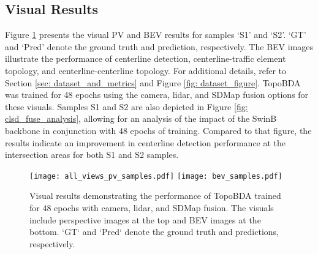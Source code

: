\subsection{Visual Results}
\label{sup_sec: visual_results}

Figure \ref{sup_fig: pv_and_bev_samples} presents the visual PV and BEV results for samples `S1' and `S2'. `GT' and `Pred' denote the ground truth and prediction, respectively. The BEV images illustrate the performance of centerline detection, centerline-traffic element topology, and centerline-centerline topology. For additional details, refer to Section \ref{sec: dataset_and_metrics} and Figure \ref{fig: dataset_figure}. TopoBDA was trained for 48 epochs using the camera, lidar, and SDMap fusion options for these visuals. Samples S1 and S2 are also depicted in Figure \ref{fig: clsd_fuse_analysis}, allowing for an analysis of the impact of the SwinB backbone in conjunction with 48 epochs of training. Compared to that figure, the results indicate an improvement in centerline detection performance at the intersection areas for both S1 and S2 samples.

\begin{figure}[tb]
  \centering
  \texttt{[image: all\_views\_pv\_samples.pdf]}
  \texttt{[image: bev\_samples.pdf]}
  \caption{Visual results demonstrating the performance of TopoBDA trained for 48 epochs with camera, lidar, and SDMap fusion. The visuals include perspective images at the top and BEV images at the bottom. `GT` and `Pred` denote the ground truth and predictions, respectively.}
  \label{sup_fig: pv_and_bev_samples}
\end{figure}

